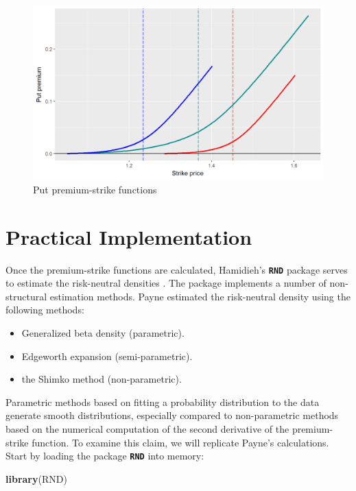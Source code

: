 \documentclass[]{book}
\newenvironment{Shaded}{\begin{snugshade}}{\end{snugshade}}
\newcommand{\KeywordTok}[1]{\textcolor[rgb]{0.13,0.29,0.53}{\textbf{#1}}}
\newcommand{\NormalTok}[1]{#1}
\providecommand{\tightlist}{%
  \setlength{\itemsep}{0pt}\setlength{\parskip}{0pt}}
\theoremstyle{definition}
\theoremstyle{definition}
\theoremstyle{definition}
\theoremstyle{remark}
\begin{document}
\begin{figure}
\includegraphics[width=1\linewidth]{images/unnamed-chunk-45-1} \caption{Put premium-strike functions}\label{fig:unnamed-chunk-45}
\end{figure}

\section{Practical Implementation}\label{practical-implementation}

Once the premium-strike functions are calculated, Hamidieh's
\textbf{\texttt{RND}} package serves to estimate the risk-neutral
densities \citep{R-RND}. The package implements a number of
non-structural estimation methods. Payne estimated the risk-neutral
density using the following methods:

\begin{itemize}
\tightlist
\item
  Generalized beta density (parametric).
\item
  Edgeworth expansion (semi-parametric).
\item
  the Shimko method (non-parametric).
\end{itemize}

Parametric methods based on fitting a probability distribution to the
data generate smooth distributions, especially compared to
non-parametric methods based on the numerical computation of the second
derivative of the premium-strike function. To examine this claim, we
will replicate Payne's calculations. Start by loading the package
\textbf{\texttt{RND}} into memory:

\begin{Shaded}
\begin{Highlighting}[]
\KeywordTok{library}\NormalTok{(RND)}
\end{Highlighting}
\end{Shaded}
\end{document}
